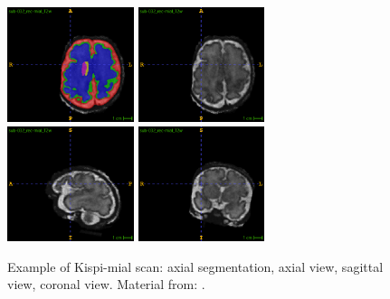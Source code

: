\begin{figure}[hbtp]
    \vspace{-10pt}
    \centering
    \includegraphics[width=0.33\textwidth]{figures/mial_ax_dseg.png}
    \hspace{5pt}
    \includegraphics[width=0.33\textwidth]{figures/mial_ax.png} \\
    \vspace{10pt}
    \includegraphics[width=0.33\textwidth]{figures/mial_sag.png}
    \hspace{5pt}
    \includegraphics[width=0.33\textwidth]{figures/mial_cor.png}
    \caption{Example of Kispi-mial scan: axial segmentation, axial view, sagittal view, coronal view. Material from: \cite{Payette2021, FeTA_MICCAI}.}
    \label{fig:kispi-mial_images}
\end{figure}
